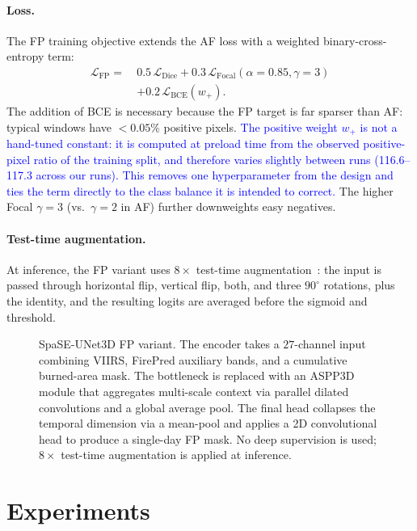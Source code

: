 \documentclass[sensors,article,submit,moreauthors,pdftex]{Definitions/mdpi}
\newcommand{\rev}[1]{\textcolor{blue}{#1}}
\begin{document}
\paragraph*{Loss.} The FP training objective extends the AF loss with a weighted binary-cross-entropy term:
\begin{align}
\mathcal{L}_{\mathrm{FP}} =\ & 0.5\, \mathcal{L}_{\mathrm{Dice}} + 0.3\, \mathcal{L}_{\mathrm{Focal}}(\alpha\!=\!0.85,\gamma\!=\!3) \nonumber \\
& + 0.2\, \mathcal{L}_{\mathrm{BCE}}(w_{+}).
\end{align}
The addition of BCE is necessary because the FP target is far sparser than AF: typical windows have $<0.05\%$ positive pixels. \rev{The positive weight $w_{+}$ is not a hand-tuned constant: it is computed at preload time from the observed positive-pixel ratio of the training split, and therefore varies slightly between runs (116.6--117.3 across our runs). This removes one hyperparameter from the design and ties the term directly to the class balance it is intended to correct.} The higher Focal $\gamma = 3$ (vs.\ $\gamma = 2$ in AF) further downweights easy negatives.

\paragraph*{Test-time augmentation.} At inference, the FP variant uses $8 \times$ test-time augmentation~\cite{wang2019aleatoric}: the input is passed through horizontal flip, vertical flip, both, and three $90^\circ$ rotations, plus the identity, and the resulting logits are averaged before the sigmoid and threshold.

\begin{figure}[H]
\centering
{}
\caption{SpaSE-UNet3D FP variant. The encoder takes a $27$-channel input combining VIIRS, FirePred auxiliary bands, and a cumulative burned-area mask. The bottleneck is replaced with an ASPP3D module that aggregates multi-scale context via parallel dilated convolutions and a global average pool. The final head collapses the temporal dimension via a mean-pool and applies a 2D convolutional head to produce a single-day FP mask. No deep supervision is used; $8\times$ test-time augmentation is applied at inference.}
\label{fig:fp_arch}
\end{figure}
\section{Experiments}
\label{sec:experiments}
\end{document}
